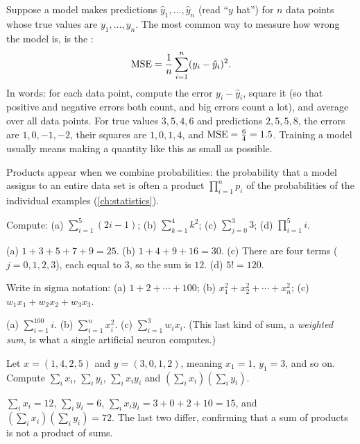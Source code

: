 \begin{mlnote}
Suppose a model makes predictions $\hat y_1, \dots, \hat y_n$ (read ``$y$
hat'') for $n$ data points whose true values are $y_1, \dots, y_n$. The most
common way to measure how wrong the model is, is the
:
\[
  \operatorname{MSE} = \frac{1}{n}\sum_{i=1}^{n} (y_i - \hat y_i)^2 .
\]
In words: for each data point, compute the error $y_i - \hat y_i$, square it
(so that positive and negative errors both count, and big errors count a lot),
and average over all data points. For true values $3, 5, 4, 6$ and predictions
$2, 5, 5, 8$, the errors are $1, 0, -1, -2$, their squares are $1, 0, 1, 4$,
and $\operatorname{MSE} = \tfrac{6}{4} = 1.5$. Training a model usually means making a
quantity like this as small as possible.

Products appear when we combine probabilities: the probability that a model
assigns to an entire data set is often a product $\prod_{i=1}^n p_i$ of the
probabilities of the individual examples (\cref{ch:statistics}).
\end{mlnote}

\sectionexercises

\begin{exercise}
Compute: (a) $\sum_{i=1}^{5}(2i - 1)$; (b) $\sum_{k=1}^{4} k^2$;
(c) $\sum_{j=0}^{3} 3$; (d) $\prod_{i=1}^{5} i$.
\end{exercise}
\begin{solution}
(a) $1 + 3 + 5 + 7 + 9 = 25$. (b) $1 + 4 + 9 + 16 = 30$.
(c) There are four terms ($j = 0,1,2,3$), each equal to $3$, so the sum is
$12$. (d) $5! = 120$.
\end{solution}

\begin{exercise}
Write in sigma notation: (a) $1 + 2 + \cdots + 100$;
(b) $x_1^2 + x_2^2 + \cdots + x_n^2$; (c) $w_1 x_1 + w_2 x_2 + w_3 x_3$.
\end{exercise}
\begin{solution}
(a) $\sum_{i=1}^{100} i$. (b) $\sum_{i=1}^{n} x_i^2$.
(c) $\sum_{i=1}^{3} w_i x_i$. (This last kind of sum, a \emph{weighted sum},
is what a single artificial neuron computes.)
\end{solution}

\begin{exercise}
Let $x = (1, 4, 2, 5)$ and $y = (3, 0, 1, 2)$, meaning $x_1 = 1$, $y_1 = 3$,
and so on. Compute $\sum_i x_i$, $\sum_i y_i$, $\sum_i x_i y_i$ and
$\left(\sum_i x_i\right)\left(\sum_i y_i\right)$.
\end{exercise}
\begin{solution}
$\sum_i x_i = 12$, $\sum_i y_i = 6$,
$\sum_i x_i y_i = 3 + 0 + 2 + 10 = 15$, and
$\left(\sum_i x_i\right)\left(\sum_i y_i\right) = 72$. The last two differ,
confirming that a sum of products is not a product of sums.
\end{solution}

